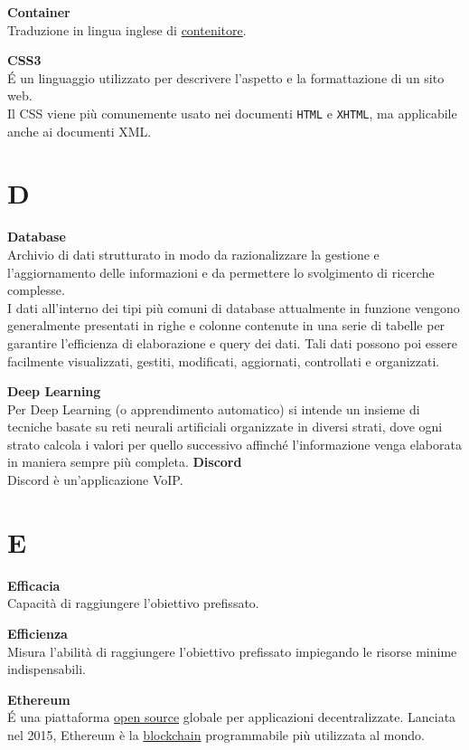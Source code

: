 \documentclass[a4paper, oneside, openany, dvipsnames, table, 12pt]{article}
\begin{document}
\textbf{Container} \\
Traduzione in lingua inglese di \hyperref[par:container]{contenitore}.

\label{par:css3}
\textbf{CSS3} \\
\'E un linguaggio utilizzato per descrivere l’aspetto e la formattazione di un sito web. \\
Il CSS viene più comunemente usato nei documenti \texttt{HTML} e \texttt{XHTML}, ma applicabile anche ai documenti XML. 

\newpage
\section{D}
\label{par:db}
\textbf{Database} \\
Archivio di dati strutturato in modo da razionalizzare la gestione e l'aggiornamento delle informazioni e da permettere lo svolgimento di ricerche complesse. \\
I dati all'interno dei tipi più comuni di database attualmente in funzione vengono generalmente presentati in righe e colonne contenute in una serie di tabelle per garantire l'efficienza di elaborazione e query dei dati. Tali dati possono poi essere facilmente visualizzati, gestiti, modificati, aggiornati, controllati e organizzati.

\textbf{Deep Learning} \\
Per Deep Learning (o apprendimento automatico) si intende un insieme di tecniche basate su reti neurali artificiali organizzate in diversi strati, dove ogni strato calcola i valori per quello successivo affinché l'informazione venga elaborata in maniera sempre più completa.
\textbf{Discord} \\
Discord è un'applicazione VoIP\glo.



\newpage
\section{E}
\textbf{Efficacia} \\
Capacità di raggiungere l'obiettivo prefissato.

\textbf{Efficienza} \\
Misura l'abilità di raggiungere l'obiettivo prefissato impiegando le risorse minime indispensabili.

\textbf{Ethereum} \\
\'E una piattaforma \hyperref[par:opens]{open source} globale per applicazioni decentralizzate. Lanciata nel 2015, Ethereum è la \hyperref[par:blockC]{blockchain} programmabile più utilizzata al mondo.
\end{document}
